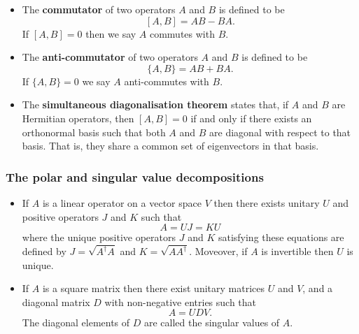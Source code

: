 \documentclass{article}
\begin{document}
\begin{itemize}
  \item The \textbf{commutator} of two operators $A$ and $B$ is defined to be \[[A, B] = A B - B A.\] If $[A, B] = 0$ then we say $A$ commutes with $B$.

  \item The \textbf{anti-commutator} of two operators $A$ and $B$ is defined to be \[\{A, B\} = A B + B A.\] If $\{A, B\} = 0$ we say $A$ anti-commutes with $B$.

  \item The \textbf{simultaneous diagonalisation theorem} states that, if $A$ and $B$ are Hermitian operators, then $[A, B] = 0$ if and only if there exists an orthonormal basis such that both $A$ and $B$ are diagonal with respect to that basis. That is, they share a common set of eigenvectors in that basis.
\end{itemize}

\subsubsection{The polar and singular value decompositions}

\begin{itemize}
  \item If $A$ is a linear operator on a vector space $V$ then there exists unitary $U$ and positive operators $J$ and $K$ such that \[A = U J = K U\] where the unique positive operators $J$ and $K$ satisfying these equations are defined by $J = \sqrt{A^\dag A}$ and $K = \sqrt{A A^\dag}$. Moveover, if $A$ is invertible then $U$ is unique.

  \item If $A$ is a square matrix then there exist unitary matrices $U$ and $V$, and a diagonal matrix $D$ with non-negative entries such that \[A = U D V.\] The diagonal elements of $D$ are called the singular values of $A$.
\end{itemize}
\end{document}
